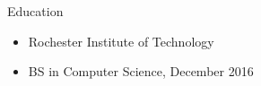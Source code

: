 \documentclass{article}
\newcommand{\lineseparator}[1]{\noindent\makebox[\linewidth]{\rule{\textwidth}{#1}}}
\begin{document}
\vspace{1mm}
{\Large Education } \\
\lineseparator{0.5pt}
\vspace{2mm}
\begin{minipage}[t]{0.5\textwidth}
  \vspace{0.5mm}
  \begin{itemize}[leftmargin=4mm]
    \item[] Rochester Institute of Technology  \vspace{-2mm}
  \end{itemize}
\end{minipage}
\begin{minipage}[t]{0.5\textwidth}
  \vspace{0.5mm}
  \begin{itemize}[leftmargin=4mm]
    \item[] BS in Computer Science, December 2016 \vspace{-2mm}
  \end{itemize}
\end{minipage}
\end{document}
